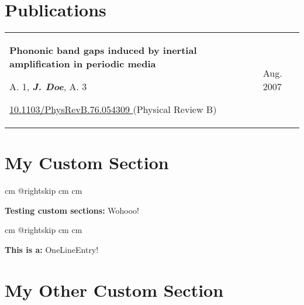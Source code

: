 \documentclass[10pt, a4paper]{article}
\let\hrefWithoutArrow\href
\renewcommand{\href}[2]{\hrefWithoutArrow{#1}{#2 \raisebox{.15ex}{\footnotesize \faExternalLink*}}}
\begin{document}
    \section{Publications}
    
        \begin{tabularx}{ cm-0.13cm}{K{0.2 cm} R{3.6 cm}}
            \textbf{Phononic band gaps induced by inertial amplification in periodic media}

            \vspace{0.07 cm}

            A. 1, \textbf{\textit{J. Doe}}, A. 3

            \vspace{0.07 cm}

            \href{https://doi.org/10.1103/PhysRevB.76.054309}{10.1103/PhysRevB.76.054309} (Physical Review B)
            &
            Aug. 2007

        \end{tabularx}



    \section{My Custom Section}
    
            \begingroup\raggedright
             cm
            \advance\csname @rightskip cm
            \advance{} cm

            \textbf{Testing custom sections:} Wohooo!

            \par\endgroup

        \vspace*{0.12 cm}
        
            \begingroup\raggedright
             cm
            \advance\csname @rightskip cm
            \advance{} cm

            \textbf{This is a:} OneLineEntry!

            \par\endgroup



    \section{My Other Custom Section}
    
\end{document}
